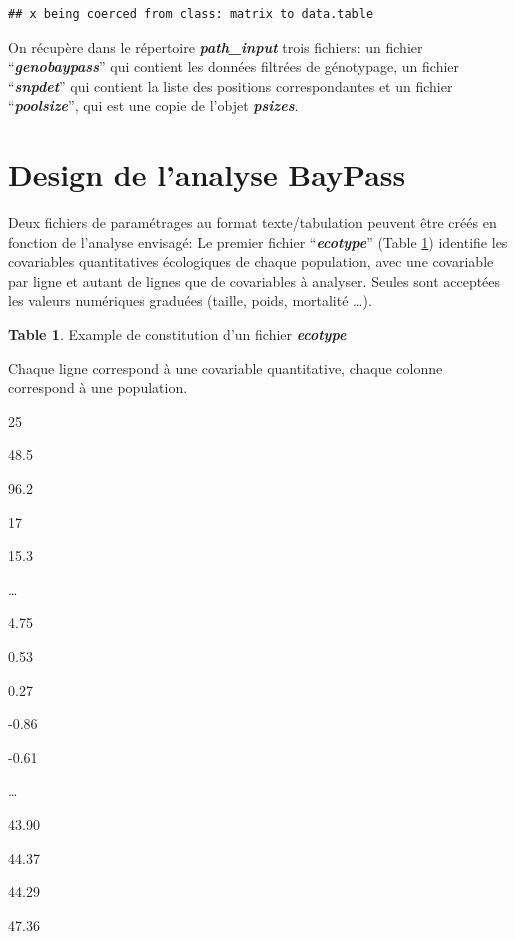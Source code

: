 \documentclass[
  openany]{book}
\theoremstyle{definition}
\newtheorem{definition}{Table}[chapter]
\theoremstyle{definition}
\theoremstyle{definition}
\theoremstyle{definition}
\theoremstyle{remark}
\begin{document}
\begin{verbatim}
## x being coerced from class: matrix to data.table
\end{verbatim}

On récupère dans le répertoire \textbf{\emph{path\_input}} trois fichiers: un fichier ``\textbf{\emph{genobaypass}}'' qui contient les données filtrées de génotypage, un fichier ``\textbf{\emph{snpdet}}'' qui contient la liste des positions correspondantes et un fichier ``\textbf{\emph{poolsize}}'', qui est une copie de l'objet \textbf{\emph{psizes}}.

\hypertarget{design-de-lanalyse-baypass}{%
\section*{Design de l'analyse BayPass}\label{design-de-lanalyse-baypass}}

Deux fichiers de paramétrages au format texte/tabulation peuvent être créés en fonction de l'analyse envisagé:
Le premier fichier ``\textbf{\emph{ecotype}}'' (Table \ref{def:table1}) identifie les covariables quantitatives écologiques de chaque population, avec une covariable par ligne et autant de lignes que de covariables à analyser. Seules sont acceptées les valeurs numériques graduées (taille, poids, mortalité \ldots).

\begin{definition}
\protect\hypertarget{def:table1}{}\label{def:table1}{Example de constitution d'un fichier \textbf{\emph{ecotype}}}
\end{definition}

Chaque ligne correspond à une covariable quantitative, chaque colonne correspond à une population.

25

48.5

96.2

17

15.3

\ldots{}

4.75

0.53

0.27

-0.86

-0.61

\ldots{}

43.90

44.37

44.29

47.36
\end{document}
